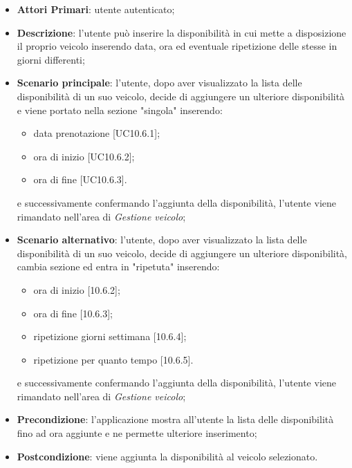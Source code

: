 \begin{itemize}
	\item \textbf{Attori Primari}: utente autenticato;
	\item \textbf{Descrizione}: l'utente può inserire la disponibilità in cui mette a disposizione il proprio veicolo inserendo data, ora ed eventuale ripetizione delle stesse in giorni differenti;
	\item \textbf{Scenario principale}: l'utente, dopo aver visualizzato la lista delle disponibilità di un suo veicolo, decide di aggiungere un ulteriore disponibilità e viene portato nella sezione "singola" inserendo:
	\begin{itemize}
		\item data prenotazione [UC10.6.1];
		\item ora di inizio [UC10.6.2];
		\item ora di fine [UC10.6.3].
	\end{itemize}
	e successivamente confermando l'aggiunta della disponibilità, l'utente viene rimandato nell'area di \textit{Gestione veicolo};
	\item \textbf{Scenario alternativo}: l'utente, dopo aver visualizzato la lista delle disponibilità di un suo veicolo, decide di aggiungere un ulteriore disponibilità, cambia sezione ed entra in "ripetuta" inserendo:
	\begin{itemize}
		\item ora di inizio [10.6.2];
		\item ora di fine [10.6.3];
		\item ripetizione giorni settimana [10.6.4];
		\item ripetizione per quanto tempo [10.6.5].
	\end{itemize}
	e successivamente confermando l'aggiunta della disponibilità, l'utente viene rimandato nell'area di \textit{Gestione veicolo};
	\item \textbf{Precondizione}: l'applicazione mostra all'utente la lista delle disponibilità fino ad ora aggiunte e ne permette ulteriore inserimento;
	\item \textbf{Postcondizione}: viene aggiunta la disponibilità al veicolo selezionato.
\end{itemize}
